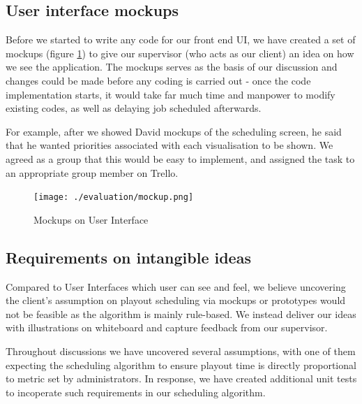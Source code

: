 \documentclass[a4paper]{article}
\begin{document}
\subsection{User interface mockups}
Before we started to write any code for our front end UI, we have created
a set of mockups (figure \ref{fig:mockup}) to give our supervisor (who acts 
as our client) an idea on how we see the application. The mockups serves as the basis
of our discussion and changes could be made before any coding is carried out -
once the code implementation starts, it would take far much time and manpower to 
modify existing codes, as well as delaying job scheduled afterwards.

For example, after we showed David mockups of the scheduling screen, he said that 
he wanted priorities associated with each visualisation to be shown. We agreed as a 
group that this would be easy to implement, and assigned the task to an appropriate
group member on Trello.  %

\begin{figure}[H]
   \begin{center}
      \texttt{[image: ./evaluation/mockup.png]}
   \end{center}
   \caption{Mockups on User Interface}
   \label{fig:mockup}
\end{figure}

\subsection{Requirements on intangible ideas}
Compared to User Interfaces which user can see and feel, we believe 
uncovering the client's assumption on playout scheduling via mockups or 
prototypes would not be feasible as the algorithm is mainly rule-based.
We instead deliver our ideas with illustrations on whiteboard and
capture feedback from our supervisor.

Throughout discussions we have uncovered several assumptions, with one of them
expecting the scheduling algorithm to ensure playout time is 
directly proportional to metric set by administrators. In response,
we have created additional unit tests to incoperate such requirements 
in our scheduling algorithm.
\end{document}
